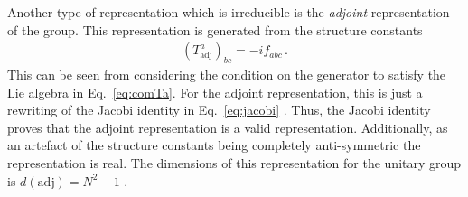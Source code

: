 Another type of representation which is irreducible is the \textit{adjoint} representation of the group. This representation is generated from the structure constants \cite{Georgi:1999wka}
\begin{align}
    (T^a_\text{adj})_{bc}=-if_{abc}\,.
\end{align}  
This can be seen from considering the condition on the generator to satisfy the Lie algebra in Eq.~\eqref{eq:comTa}. For the adjoint representation, this is just a rewriting of the Jacobi identity in Eq.~\eqref{eq:jacobi} \cite{Georgi:1999wka}. Thus, the Jacobi identity proves that the adjoint representation is a valid representation. Additionally, as an artefact of the structure constants being completely anti-symmetric the representation is real. The dimensions of this representation for the unitary group is $d(\text{adj})=N^2-1$ \cite{Peskin:1995ev}.

